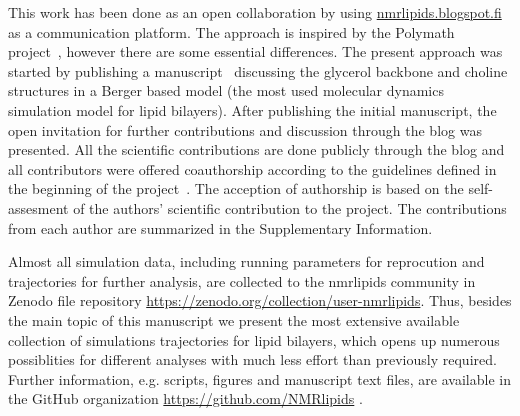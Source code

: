 \documentclass[journal=jacsat,manuscript=article]{achemso}
\begin{document}
This work has been done as an open collaboration by using \url{nmrlipids.blogspot.fi}~\cite{nmrlipids}
as a communication platform.
The approach is inspired by the Polymath project~\cite{gowers09}, however there are some essential differences. 
The present approach was started by publishing a manuscript~\cite{ollila13} discussing the glycerol backbone and choline structures 
in a Berger based model (the most used molecular dynamics simulation model for lipid bilayers).
After publishing the initial manuscript, the open invitation for further contributions and discussion through the blog was presented.
All the scientific contributions are done publicly through the blog and all contributors were offered coauthorship
according to the guidelines defined in the beginning of the project~\cite{creditsPOST}. 
The acception of authorship is based on the self-assesment of the authors' scientific contribution to the project.
The contributions from each author are summarized in the Supplementary Information. %

Almost all simulation data, including running parameters for reprocution and trajectories for further analysis, are collected
to the nmrlipids community in Zenodo file repository \url{https://zenodo.org/collection/user-nmrlipids}.
Thus, besides the main topic of this manuscript we present the most extensive available collection of simulations trajectories
for lipid bilayers, which opens up numerous possiblities for different analyses with much less effort than previously required.
Further information, e.g. scripts, figures and manuscript text files, are available in the GitHub 
organization \url{https://github.com/NMRlipids} .
\end{document}
